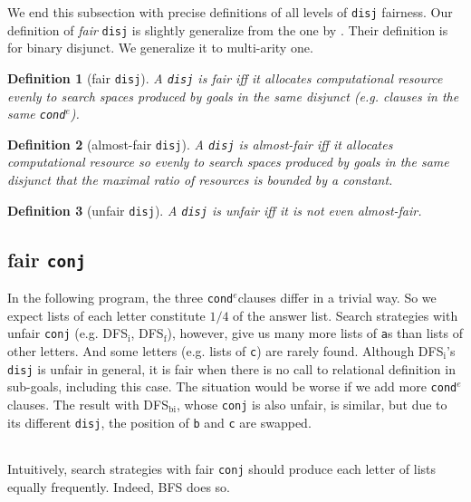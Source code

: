 \documentclass[format=acmlarge, review=true, authordraft=true]{acmart}
\newcommand{\conde}{\texttt{cond$^e$}}
\newcommand{\conj}{\texttt{conj}}
\newcommand{\disj}{\texttt{disj}}
\newtheorem{defn}{Definition}[section]
\begin{document}
We end this subsection with precise definitions of all levels of 
\disj{} fairness. Our definition of \emph{fair} \disj{} is slightly generalize 
from the one by \citet{seres1999algebra}. Their definition is for binary 
disjunct. We generalize it to multi-arity one.

\begin{defn}[fair \disj{}]
	A \disj{} is fair iff it allocates computational resource evenly to 
	search spaces produced by goals in the same disjunct (e.g. clauses in the 
	same 
	\conde).
\end{defn}

\begin{defn}[almost-fair \disj{}]
	A \disj{} is almost-fair iff it allocates computational resource so 
	evenly to search spaces produced by goals in the same disjunct that the 
	maximal 
	ratio of resources is bounded by a constant.
\end{defn}

\begin{defn}[unfair \disj{}]
	A \disj{} is unfair iff it is not even almost-fair.
\end{defn}

\subsection{fair \texttt{conj}}

In the following program, the three \conde clauses differ in a trivial way. So 
we expect lists of each letter constitute $1/4$ of the answer list. Search 
strategies with unfair \conj{} (e.g. DFS$_\textrm{i}$, DFS$_\textrm{f}$), 
however, give us many more lists of \texttt{a}s than lists of other letters. 
And some letters (e.g. lists 
of \texttt{c}) are rarely found. Although DFS$_\textrm{i}$'s \disj{} is unfair in general, 
it is fair when there is no call to relational definition in sub-goals, 
including this case. The situation would be worse if we add more \conde 
clauses. The result with DFS$_\textrm{bi}$, whose \conj{} is also unfair, is similar, but 
due to its different \disj{}, the position of \texttt{b} and \texttt{c} are 
swapped. 

\begin{center}
	\begin{tabular}{c}
		
	\end{tabular}
\end{center}

Intuitively, search strategies with fair \conj{} should produce each letter of 
lists equally frequently. Indeed, BFS does so.
\end{document}
